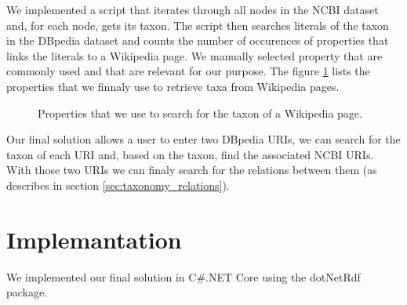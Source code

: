 \documentclass{article}
\begin{document}
We implemented a script that iterates through all nodes in the NCBI dataset and, for each node, gets its taxon. The script then searches literals of the taxon in the DBpedia dataset and counts the number of occurences of properties that links the literals to a Wikipedia page. We manually selected property that are commonly used and that are relevant for our purpose. The figure \ref{lst:taxon_properties} lists the properties that we finnaly use to retrieve taxa from Wikipedia pages.

\begin{figure}[h]

\caption{Properties that we use to search for the taxon of a Wikipedia page.}
\label{lst:taxon_properties}
\end{figure}

Our final solution allows a user to enter two DBpedia URIs, we can search for the taxon of each URI and, based on the taxon, find the associated NCBI URIs. With those two URIs we can finaly search for the relations between them (as describes in section \ref{sec:taxonomy_relations}).

\section{Implemantation}

We implemented our final solution in C\#.NET Core using the dotNetRdf package. %
\end{document}
